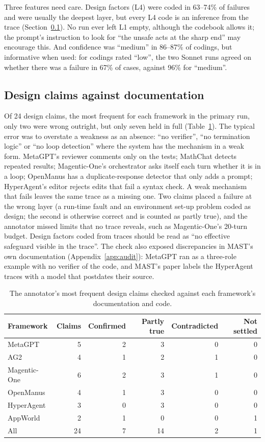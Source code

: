 \documentclass[10pt]{article}
\begin{document}
Three features need care. Design factors (L4) were coded in 63--74\% of failures
and were usually the deepest layer, but every L4 code is an inference from the
trace (Section~\ref{sec:designcheck}). No run ever left L1 empty, although the
codebook allows it; the prompt's instruction to look for ``the unsafe acts at the
sharp end'' may encourage this. And confidence was ``medium'' in 86--87\% of
codings, but informative when used: for codings rated ``low'', the two Sonnet runs
agreed on whether there was a failure in 67\% of cases, against 96\% for
``medium''.

\subsection{Design claims against documentation}
\label{sec:designcheck}

Of 24 design claims, the most frequent for each framework in the primary run, only
two were wrong outright, but only seven held in full (Table~\ref{tab:designcheck}). The typical error was
to overstate a weakness as an absence: ``no verifier'', ``no termination logic'' or
``no loop detection'' where the system has the mechanism in a weak form. MetaGPT's
reviewer comments only on the tests; MathChat detects repeated results;
Magentic-One's orchestrator asks itself each turn whether it is in a loop;
OpenManus has a duplicate-response detector that only adds a prompt; HyperAgent's
editor rejects edits that fail a syntax check. A weak mechanism that fails leaves
the same trace as a missing one. Two claims placed a failure at the wrong layer (a
run-time fault and an environment set-up problem coded as design; the second is
otherwise correct and is counted as partly true), and the
annotator missed limits that no trace reveals, such as Magentic-One's 20-turn
budget. Design factors coded from traces should be read as ``no effective
safeguard visible in the trace''. The check also exposed discrepancies in MAST's
own documentation (Appendix~\ref{app:audit}): MetaGPT ran as a three-role example
with no verifier of the code, and MAST's paper labels the HyperAgent traces with a
model that postdates their source.

\begin{table}[tbp]
\centering
\caption{The annotator's most frequent design claims checked against each
framework's documentation and code.}
\label{tab:designcheck}
\small
\begin{tabular}{@{}lrrrrr@{}}
\toprule
Framework & Claims & Confirmed & Partly true & Contradicted & Not settled\\
\midrule
MetaGPT & 5 & 2 & 3 & 0 & 0\\
AG2 & 4 & 1 & 2 & 1 & 0\\
Magentic-One & 6 & 2 & 3 & 1 & 0\\
OpenManus & 4 & 1 & 3 & 0 & 0\\
HyperAgent & 3 & 0 & 3 & 0 & 0\\
AppWorld & 2 & 1 & 0 & 0 & 1\\
\midrule
All & 24 & 7 & 14 & 2 & 1\\
\bottomrule
\end{tabular}
\end{table}
\end{document}
